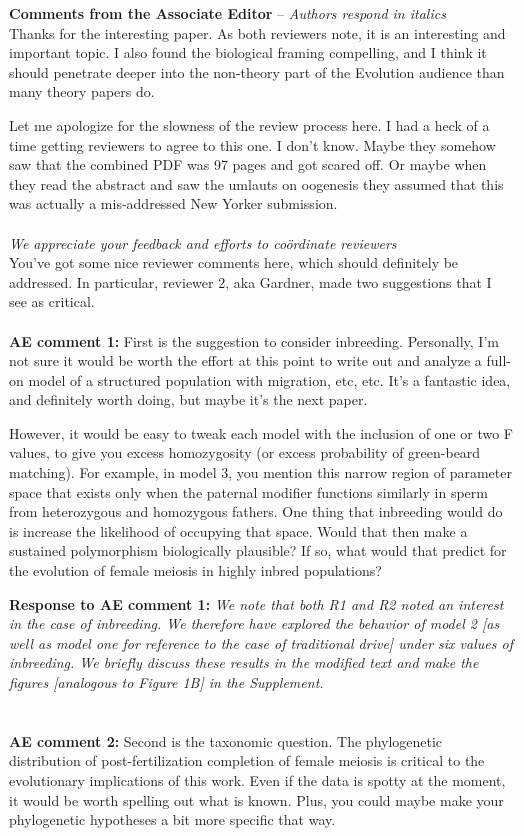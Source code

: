 \documentclass[12pt,letterpaper]{article}
\begin{document}
\newpage

{\bf{Comments from the Associate Editor}} -- \emph{Authors respond in italics}  \\ 


Thanks for the interesting paper. As both reviewers note, it is an interesting and important topic. I also found the biological framing compelling, and I think it should penetrate deeper into the non-theory part of the Evolution audience than many theory papers do.

Let me apologize for the slowness of the review process here. I had a heck of a time getting reviewers to agree to this one. I don't know. Maybe they somehow saw that the combined PDF was 97 pages and got scared off. Or maybe when they read the abstract and saw the umlauts on oogenesis they assumed that this was actually a mis-addressed New Yorker submission.
\\ \\
\emph{We appreciate your feedback and efforts to co\"{o}rdinate reviewers}
\\

You've got some nice reviewer comments here, which should definitely be addressed. In particular, reviewer 2, aka Gardner, made two suggestions that I see as critical.
\\ \\
{\bf{AE comment 1:}} First is the suggestion to consider inbreeding. Personally, I'm not sure it would be worth the effort at this point to write out and analyze a full-on model of a structured population with migration, etc, etc. It's a fantastic idea, and definitely worth doing, but maybe it's the next paper.

However, it would be easy to tweak each model with the inclusion of one or two F values, to give you excess homozygosity (or excess probability of green-beard matching). For example, in model 3, you mention this narrow region of parameter space that exists only when the paternal modifier functions similarly in sperm from heterozygous and homozygous fathers. One thing that inbreeding would do is increase the likelihood of occupying that space. Would that then make a sustained polymorphism biologically plausible? If so, what would that predict for the evolution of female meiosis in highly inbred populations?

{\bf{Response to AE comment 1:}}  \emph{We note that both R1 and R2 noted an interest in the case of inbreeding. We therefore have explored the behavior of model 2 [as well as model one for reference to the case of traditional drive] under six values of inbreeding. We briefly discuss these results in the modified text and make the figures [analogous to Figure 1B] in the Supplement.}
\\
\\
\\
{\bf{AE comment 2:}} Second is the taxonomic question. The phylogenetic distribution of post-fertilization completion of female meiosis is critical to the evolutionary implications of this work. Even if the data is spotty at the moment, it would be worth spelling out what is known. Plus, you could maybe make your phylogenetic hypotheses a bit more specific that way.
\end{document}
